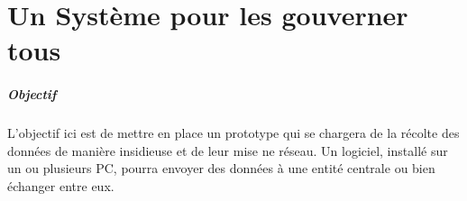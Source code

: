 \chapter{Un Système pour les gouverner tous}

\paragraph{Objectif} L'objectif ici est de mettre en place un prototype qui se chargera de la récolte des données
de manière insidieuse et de leur mise ne réseau. Un logiciel, installé sur un ou plusieurs PC, pourra envoyer des 
données à une entité centrale ou bien échanger entre eux.




 
